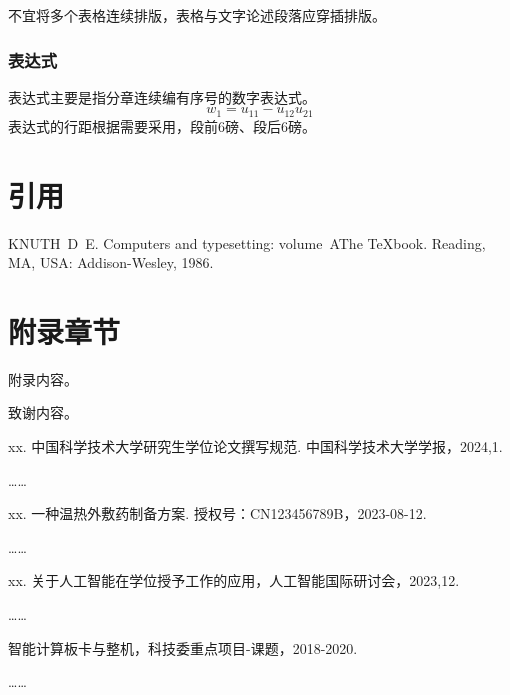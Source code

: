不宜将多个表格连续排版，表格与文字论述段落应穿插排版。

\clearpage

\subsection{表达式}

表达式主要是指分章连续编有序号的数字表达式。
\begin{equation}
  w_1 = u_{11} - u_{12} u_{21}
  \label{eq:example}
\end{equation}
表达式的行距根据需要采用，段前6磅、段后6磅。

\chapter{引用}
\cite{knuth86a}

\begin{thebibliography}{1}
KNUTH~D~E.
\newblock Computers and typesetting: volume~A\quad The
  {\TeX}book\allowbreak[M].
\newblock Reading, MA, USA: Addison-Wesley, 1986.
\end{thebibliography}

\appendix
\chapter{附录章节}
附录内容。

\backmatter
\begin{acknowledgements}
  致谢内容。
\end{acknowledgements}

\begin{achievements}

  \begin{theachievements}[已发表论文]
    \item xx. 中国科学技术大学研究生学位论文撰写规范. 中国科学技术大学学报，2024,1.
    \item ……
  \end{theachievements}

  \begin{theachievements}[发明专利]
    \item xx. 一种温热外敷药制备方案. 授权号：CN123456789B，2023-08-12.
    \item ……
  \end{theachievements}

  \begin{theachievements}[会议论文]
    \item xx. 关于人工智能在学位授予工作的应用，人工智能国际研讨会，2023,12.
    \item ……
  \end{theachievements}

  \begin{theachievements}[参与的科研项目]
    \item 智能计算板卡与整机，科技委重点项目-课题，2018-2020.
    \item ……
  \end{theachievements}

\end{achievements}

